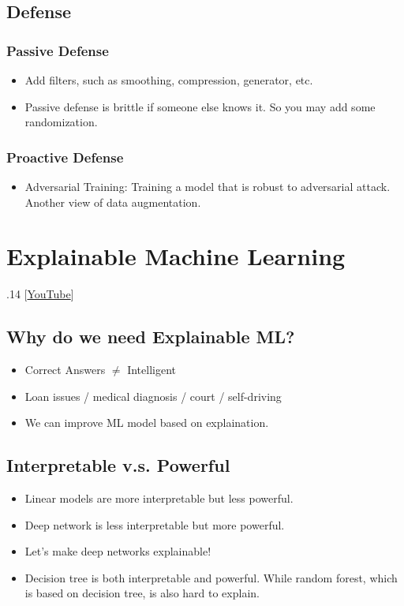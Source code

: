 \documentclass[11pt]{book}
\begin{document}
\section{Defense}
\subsection{Passive Defense}
\begin{itemize}
    \item Add filters, such as smoothing, compression, generator, etc.
    \item Passive defense is brittle if someone else knows it. So you may add some randomization.
\end{itemize}
\subsection{Proactive Defense}
\begin{itemize}
    \item Adversarial Training: Training a model that is robust to adversarial attack. Another view of data augmentation.
\end{itemize}

\chapter{Explainable Machine Learning}
.14 [\href{https://www.youtube.com/watch?v=WQY85vaQfTI&list=PLJV_el3uVTsMhtt7_Y6sgTHGHp1Vb2P2J&index=26}{YouTube}]
\section{Why do we need Explainable ML?}
\begin{itemize}
    \item Correct Answers $\neq$ Intelligent
    \item Loan issues / medical diagnosis / court / self-driving
    \item We can improve ML model based on explaination.
\end{itemize}
\section{Interpretable v.s. Powerful}
\begin{itemize}
    \item Linear models are more interpretable but less powerful.
    \item Deep network is less interpretable but more powerful.
    \item Let's make deep networks explainable!
    \item Decision tree is both interpretable and powerful. While random forest, which is based on decision tree, is also hard to explain.
\end{itemize}
\end{document}
